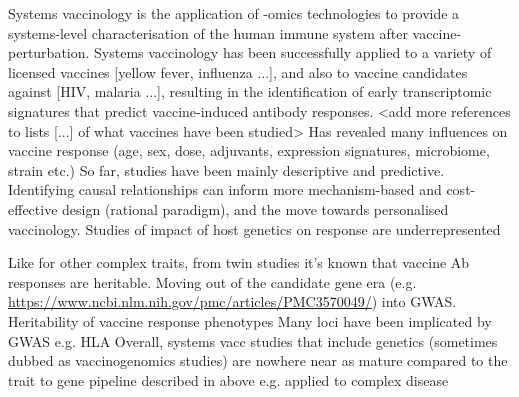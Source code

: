 \begin{outline}
\1 Systems vaccinology is the application of -omics technologies to provide a systems-level characterisation of the human immune system after vaccine-perturbation.
    \2 Systems vaccinology has been successfully applied to a variety of licensed vaccines [yellow fever, influenza ...], and also to vaccine candidates against [HIV, malaria ...], resulting in the identification of early transcriptomic signatures that predict vaccine-induced antibody responses.
        \3 <add more references to lists [...] of what vaccines have been studied>
    \2 Has revealed many influences on vaccine response (age, sex, dose, adjuvants, expression signatures, microbiome, strain etc.)
    \2 So far, studies have been mainly descriptive and predictive.
    \2 Identifying causal relationships can inform more mechanism-based and cost-effective design (rational paradigm), and the move towards personalised vaccinology.
    \2 Studies of impact of host genetics on response are underrepresented \autocite{linnik2016ImpactHostGenetic}

\1 Like for other complex traits, from twin studies it's known that vaccine Ab responses are heritable.
    \2 Moving out of the candidate gene era (e.g. \url{https://www.ncbi.nlm.nih.gov/pmc/articles/PMC3570049/}) into GWAS.
    \2 Heritability of vaccine response phenotypes \autocite{oconnor2013CharacterizingVaccineResponses}
    \2 Many loci have been implicated by GWAS e.g. HLA \autocite{oconnor2013CharacterizingVaccineResponses,mooney2013SystemsImmunogeneticsVaccines,mentzer2015SearchingHumanGenetic,linnik2016ImpactHostGenetic,scepanovic2018HumanGeneticVariants,dhakal2019HostFactorsImpact}
    \2 Overall, systems vacc studies that include genetics (sometimes dubbed as vaccinogenomics studies) are nowhere near as mature compared to the trait to gene pipeline described in above e.g. applied to complex disease


\end{outline}
